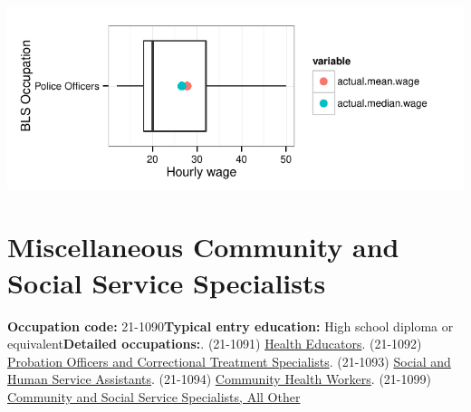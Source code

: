 \documentclass[a4paper,10pt]{article}\usepackage[]{graphicx}\usepackage[]{color}
\makeatletter
\def\maxwidth{ %
  \ifdim\Gin@nat@width>\linewidth
    \linewidth
  \else
    \Gin@nat@width
  \fi
}
\makeatother
\begin{document}
{\centering \includegraphics[width=\maxwidth]{figure/unnamed-chunk-246} 

}


\newpage\section{Miscellaneous Community and Social Service Specialists}\textbf{Occupation code:} 21-1090\newline\textbf{Typical entry education:} High school diploma or equivalent\newline\textbf{Detailed occupations:}. (21-1091)  \href{http://www.bls.gov/oes/current/oes211091.htm}{Health Educators}. (21-1092)  \href{http://www.bls.gov/oes/current/oes211092.htm}{Probation Officers and Correctional Treatment Specialists}. (21-1093)  \href{http://www.bls.gov/oes/current/oes211093.htm}{Social and Human Service Assistants}. (21-1094)  \href{http://www.bls.gov/oes/current/oes211094.htm}{Community Health Workers}. (21-1099)  \href{http://www.bls.gov/oes/current/oes211099.htm}{Community and Social Service Specialists, All Other}\newline%
\end{document}
